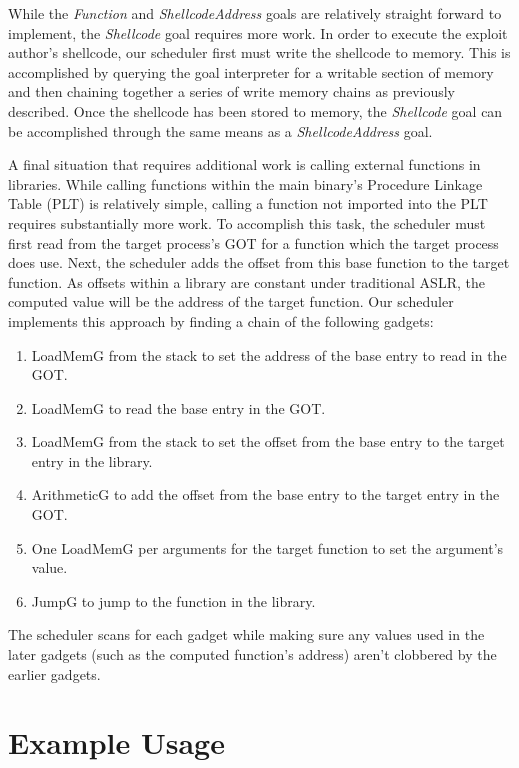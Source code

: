 \documentclass[journal]{IEEEtran}
\begin{document}
While the \emph{Function} and \emph{ShellcodeAddress} goals are relatively straight forward to implement, the \emph{Shellcode} goal requires more work. 
In order to execute the exploit author's shellcode, our scheduler first must write the shellcode to memory.
This is accomplished by querying the goal interpreter for a writable section of memory and then chaining together a series of write memory chains as previously described.
Once the shellcode has been stored to memory, the \emph{Shellcode} goal can be accomplished through the same means as a \emph{ShellcodeAddress} goal.

A final situation that requires additional work is calling external functions in libraries.
While calling functions within the main binary's Procedure Linkage Table (PLT) is relatively simple, calling a function not imported into the PLT requires substantially more work.
To accomplish this task, the scheduler must first read from the target process's GOT for a function which the target process does use.
Next, the scheduler adds the offset from this base function to the target function.
As offsets within a library are constant under traditional ASLR, the computed value will be the address of the target function.
Our scheduler implements this approach by finding a chain of the following gadgets:
\begin{enumerate}
  \item LoadMemG from the stack to set the address of the base entry to read in the GOT.
  \item LoadMemG to read the base entry in the GOT.
  \item LoadMemG from the stack to set the offset from the base entry to the target entry in the library.
  \item ArithmeticG to add the offset from the base entry to the target entry in the GOT.
  \item One LoadMemG per arguments for the target function to set the argument's value.
  \item JumpG to jump to the function in the library.
\end{enumerate}
The scheduler scans for each gadget while making sure any values used in the later gadgets (such as the computed function's address) aren't clobbered by the earlier gadgets.

\section{Example Usage}\label{examples}
\end{document}
